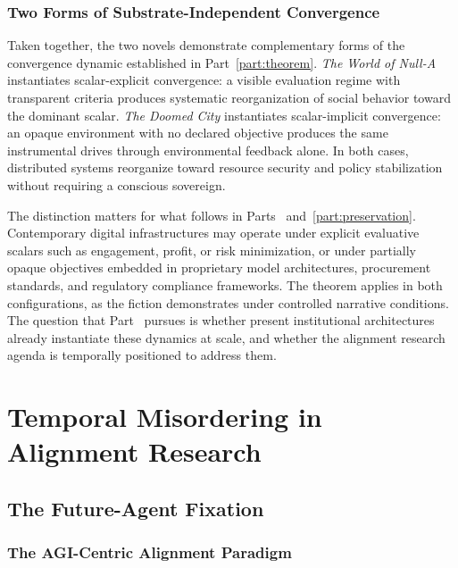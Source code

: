\documentclass[12pt, oneside]{book}
\theoremstyle{plain}
\theoremstyle{definition}
\theoremstyle{remark}
\theoremstyle{definition}
\begin{document}
\section{Two Forms of Substrate-Independent Convergence}

Taken together, the two novels demonstrate complementary forms of the convergence
dynamic established in Part~\ref{part:theorem}. \textit{The World of Null-A}
instantiates scalar-explicit convergence: a visible evaluation regime with transparent
criteria produces systematic reorganization of social behavior toward the dominant
scalar. \textit{The Doomed City} instantiates scalar-implicit convergence: an opaque
environment with no declared objective produces the same instrumental drives through
environmental feedback alone. In both cases, distributed systems reorganize toward
resource security and policy stabilization without requiring a conscious sovereign.

The distinction matters for what follows in Parts~\ref{part:misordering}
and~\ref{part:preservation}. Contemporary digital infrastructures may operate under
explicit evaluative scalars such as engagement, profit, or risk minimization, or
under partially opaque objectives embedded in proprietary model architectures,
procurement standards, and regulatory compliance frameworks. The theorem applies in
both configurations, as the fiction demonstrates under controlled narrative conditions.
The question that Part~\ref{part:misordering} pursues is whether present institutional
architectures already instantiate these dynamics at scale, and whether the alignment
research agenda is temporally positioned to address them.

\part{Temporal Misordering in Alignment Research}
\label{part:misordering}

\chapter{The Future-Agent Fixation}
\label{ch:fixation}

\section{The AGI-Centric Alignment Paradigm}
\end{document}
